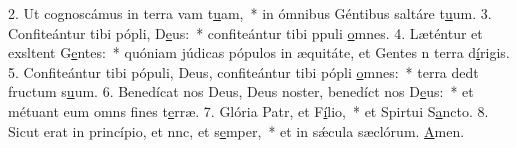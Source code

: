 2. Ut cognoscámus in terra vam t\uline{u}am,~* in ómnibus Géntibus saltáre t\uline{u}um.
3. Confiteántur tibi pópli, D\uline{e}us:~* confiteántur tibi ppuli \uline{o}mnes.
4. Læténtur et exsltent G\uline{e}ntes:~* quóniam júdicas pópulos in æquitáte, et Gentes n terra d\uline{í}rigis.
5. Confiteántur tibi pópuli, Deus, confiteántur tibi pópli \uline{o}mnes:~* terra dedt fructum s\uline{u}um.
6. Benedícat nos Deus, Deus noster, benedíct nos D\uline{e}us:~* et métuant eum omns fines t\uline{e}rræ.
7. Glória Patr, et F\uline{í}lio,~* et Spirtui S\uline{a}ncto.
8. Sicut erat in princípio, et nnc, et s\uline{e}mper,~* et in sǽcula sæclórum. \uline{A}men.
